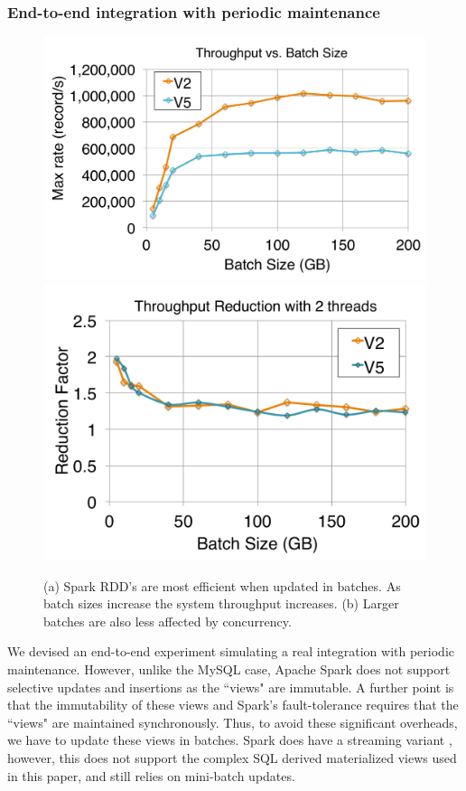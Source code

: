 \subsubsection{End-to-end integration with periodic maintenance}
\begin{figure}[t]
\centering
 \includegraphics[scale=0.14]{exp/con_3.pdf}
 \includegraphics[scale=0.14]{exp/con_4.pdf}
 \caption{(a) Spark RDD's are most efficient when updated in batches. As batch sizes increase the system throughput increases. (b) Larger batches are also less affected by concurrency. \label{conv-2}}
\end{figure}

We devised an end-to-end experiment simulating a real integration with periodic maintenance.
However, unlike the MySQL case, Apache Spark does not support selective updates and insertions as the ``views" are immutable.
A further point is that the immutability of these views and Spark's fault-tolerance requires that the ``views" are maintained synchronously.
Thus, to avoid these significant overheads, we have to update these views in batches.
Spark does have a streaming variant \cite{zaharia2012discretized}, however, this does not support the complex SQL derived materialized views used in this paper, and still relies on mini-batch updates.

